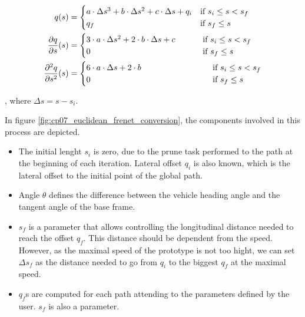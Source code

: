 \begin{equation}\label{eq:cp07_function_q}
\begin{align*}
q(s) &=
  \begin{cases}
   a \cdot \Delta s^3 + b \cdot \Delta s^2 + c \cdot \Delta s + q_i & \text{if } s_i \le s < s_f \\
   q_f        & \text{if } s_f \le s
  \end{cases}\\
{{\partial q} \over {\partial s}}(s) &=
  \begin{cases}
   3 \cdot a \cdot \Delta s^2 + 2 \cdot b \cdot \Delta s + c & ~~~~~~~\text{if } s_i \le s < s_f \\
   0        & ~~~~~~~\text{if } s_f \le s
  \end{cases}\\
{{\partial^2 q} \over {\partial s^2}}(s) &=
  \begin{cases}
   6 \cdot a \cdot \Delta s + 2 \cdot b & ~~~~~~~~~~~~~~~~~~~~~~~\text{if } s_i \le s < s_f \\
   0        & ~~~~~~~~~~~~~~~~~~~~~~~\text{if } s_f \le s
  \end{cases}
\end{align*}
\end{equation}

, where $\Delta s = s - s_i$.

In figure \ref{fig:cp07_euclidean_frenet_conversion}, the components involved in this process are depicted.
\begin{itemize}
 \item The initial lenght $s_i$ is zero, due to the prune task performed to the path at the beginning of each iteration. Lateral offset $q_i$ is also known, which is the lateral offset to the initial point of the global path.
 \item Angle $\theta$ defines the difference between the vehicle heading angle and the tangent angle of the base frame.
 \item $s_f$ is a parameter that allows controlling the longitudinal distance needed to reach the offset $q_f$. This distance should be dependent from the speed. However, as the maximal speed of the prototype is not too hight, we can set $\Delta s_f$ as the distance needed to go from $q_i$ to the biggest $q_f$ at the maximal speed.
 \item $q_f$s are computed for each path attending to the parameters defined by the user. $s_f$ is also a parameter.
\end{itemize}

